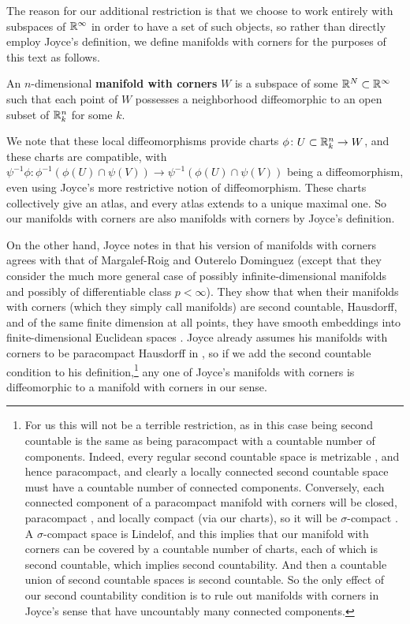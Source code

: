 The reason for our additional restriction is that we choose to work entirely with subspaces of $\mathbb{R}^\infty$ in order to have a set of such objects, so rather than directly employ Joyce's definition, we define manifolds with corners for the purposes of this text as follows.

\begin{definition}\label{D: MWC}
	An $n$-dimensional \textbf{manifold with corners} $W$ is a subspace of some $\mathbb{R}^N \subset \mathbb{R}^\infty$ such that each point of $W$ possesses a neighborhood diffeomorphic to an open subset of $\mathbb{R}^n_k$ for some $k$.
\end{definition}

We note that these local diffeomorphisms provide charts $\phi \colon U \subset \mathbb{R}^n_k \to W$, and these charts are compatible, with $\psi^{-1}\phi \colon \phi^{-1}(\phi(U) \cap \psi(V)) \to \psi^{-1}(\phi(U) \cap \psi(V))$ being a diffeomorphism, even using Joyce's more restrictive notion of diffeomorphism.
These charts collectively give an atlas, and every atlas extends to a unique maximal one.
So our manifolds with corners are also manifolds with corners by Joyce's definition.

On the other hand, Joyce notes in \cite[Remark 2.11 (see also Remark 6.3)]{Joy12} that his version of manifolds with corners agrees with that of Margalef-Roig and Outerelo Dominguez \cite{MaDo92} (except that they consider the much more general case of possibly infinite-dimensional manifolds and possibly of differentiable class $p<\infty$). 
They show that when their manifolds with corners (which they simply call manifolds) are second countable, Hausdorff, and of the same finite dimension at all points, they have smooth embeddings into finite-dimensional Euclidean spaces \cite[Corollary 11.3.10]{MaDo92}.  
Joyce already assumes his manifolds with corners to be paracompact Hausdorff in \cite[Definition 2.1]{Joy12}, so if we add the second countable condition to his definition,\footnote{For us this will not be a terrible restriction, as in this case being second countable is the same as being paracompact with a countable number of components. 
Indeed, every regular second countable space is metrizable \cite[Theorem 34.1]{Mu00}, and hence paracompact, and clearly a locally connected second countable space must have a countable number of connected components. 
Conversely, each connected component of a paracompact manifold with corners will be closed, paracompact \cite[Theorem 41.2]{Mu00}, and locally compact (via our charts), so it will be $\sigma$-compact \cite[Appendix A.1]{Sp79}. 
A $\sigma$-compact space is Lindelof, and this implies that our manifold with corners can be covered by a countable number of charts, each of which is second countable, which implies second countability. 
And then a countable union of second countable spaces is second countable.
So the only effect of our second countability condition is to rule out manifolds with corners in Joyce's sense that have uncountably many connected components.} 
any one of Joyce's manifolds with corners is diffeomorphic to a manifold with corners in our sense.

